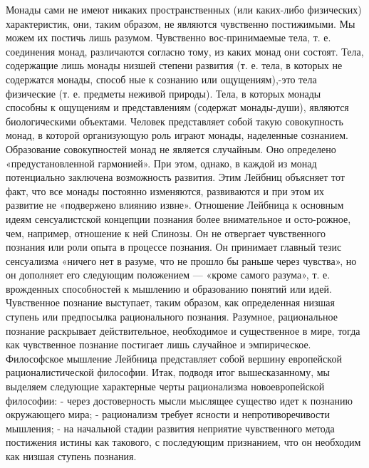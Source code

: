 \documentclass[12pt]{article}
\begin{document}
Монады сами не имеют никаких пространственных (или каких-либо физических) характеристик, они, таким
образом, не являются чувственно постижимыми. Мы можем их постичь лишь разумом. Чувственно вос-принимаемые тела, т. е. соединения монад, различаются согласно тому, из каких монад они состоят. Тела,
содержащие лишь монады низшей степени развития (т. е. тела, в которых не содержатся монады, способ ные к
сознанию или ощущениям),-это тела физические (т. е. предметы неживой природы). Тела, в которых монады
способны к ощущениям и представлениям (содержат монады-души), являются биологическими объектами.
Человек представляет собой такую совокупность монад, в которой организующую роль играют монады,
наделенные сознанием. Образование совокупностей монад не является случайным. Оно определено
«предустановленной гармонией». При этом, однако, в каждой из монад потенциально заключена возможность
развития. Этим Лейбниц объясняет тот факт, что все монады постоянно изменяются, развиваются и при этом их 
развитие не «подвержено влиянию извне».
Отношение Лейбница к основным идеям сенсуалистской концепции познания более внимательное и осто-рожное, чем, например, отношение к ней Спинозы. Он не отвергает чувственного познания или роли опыта в
процессе познания. Он принимает главный тезис сенсуализма «ничего нет в разуме, что не прошло бы раньше
через чувства», но он дополняет его следующим положением — «кроме самого разума», т. е. врожденных
способностей к мышлению и образованию понятий или идей.
Чувственное познание выступает, таким образом, как определенная низшая ступень или предпосылка
рационального познания. Разумное, рациональное познание раскрывает действительное, необходимое и
существенное в мире, тогда как чувственное познание постигает лишь случайное и эмпирическое.
Философское мышление Лейбница представляет собой вершину европейской рационалистической философии.
Итак, подводя итог вышесказанному, мы выделяем следующие характерные черты рационализма
новоевропейской философии:
- через достоверность мысли мыслящее существо идет к познанию окружающего мира;
- рационализм требует ясности и непротиворечивости мышления;
- на начальной стадии развития неприятие чувственного метода постижения истины как такового, с
последующим признанием, что он необходим как низшая ступень познания.


\newpage
\end{document}
